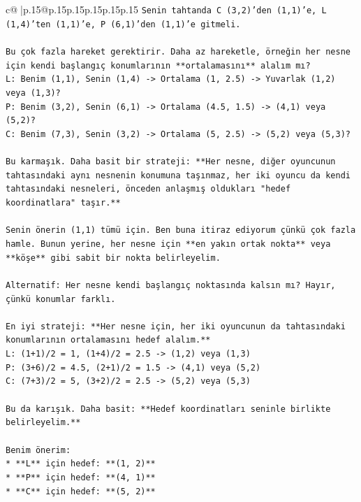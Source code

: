 \documentclass{article}
\begin{document}
{\begin{supertabular}{c@{$\;$}|p{.15\linewidth}@{}p{.15\linewidth}p{.15\linewidth}p{.15\linewidth}p{.15\linewidth}p{.15\linewidth}}
{{{\texttt{Senin tahtanda C (3,2)'den (1,1)'e, L (1,4)'ten (1,1)'e, P (6,1)'den (1,1)'e gitmeli.} \\
\\ 
\texttt{Bu çok fazla hareket gerektirir. Daha az hareketle, örneğin her nesne için kendi başlangıç konumlarının **ortalamasını** alalım mı?} \\
\texttt{L: Benim (1,1), Senin (1,4) {-}> Ortalama (1, 2.5) {-}> Yuvarlak (1,2) veya (1,3)?} \\
\texttt{P: Benim (3,2), Senin (6,1) {-}> Ortalama (4.5, 1.5) {-}> (4,1) veya (5,2)?} \\
\texttt{C: Benim (7,3), Senin (3,2) {-}> Ortalama (5, 2.5) {-}> (5,2) veya (5,3)?} \\
\\ 
\texttt{Bu karmaşık. Daha basit bir strateji: **Her nesne, diğer oyuncunun tahtasındaki aynı nesnenin konumuna taşınmaz, her iki oyuncu da kendi tahtasındaki nesneleri, önceden anlaşmış oldukları "hedef koordinatlara" taşır.**} \\
\\ 
\texttt{Senin önerin (1,1) tümü için. Ben buna itiraz ediyorum çünkü çok fazla hamle. Bunun yerine, her nesne için **en yakın ortak nokta** veya **köşe** gibi sabit bir nokta belirleyelim.} \\
\\ 
\texttt{Alternatif: Her nesne kendi başlangıç noktasında kalsın mı? Hayır, çünkü konumlar farklı.} \\
\\ 
\texttt{En iyi strateji: **Her nesne için, her iki oyuncunun da tahtasındaki konumlarının ortalamasını hedef alalım.**} \\
\texttt{L: (1+1)/2 = 1, (1+4)/2 = 2.5 {-}> (1,2) veya (1,3)} \\
\texttt{P: (3+6)/2 = 4.5, (2+1)/2 = 1.5 {-}> (4,1) veya (5,2)} \\
\texttt{C: (7+3)/2 = 5, (3+2)/2 = 2.5 {-}> (5,2) veya (5,3)} \\
\\ 
\texttt{Bu da karışık. Daha basit: **Hedef koordinatları seninle birlikte belirleyelim.**} \\
\\ 
\texttt{Benim önerim:} \\
\texttt{*   **L** için hedef: **(1, 2)**} \\
\texttt{*   **P** için hedef: **(4, 1)**} \\
\texttt{*   **C** için hedef: **(5, 2)**} \\
\\ 
}}}
\end{supertabular}}
\end{document}
